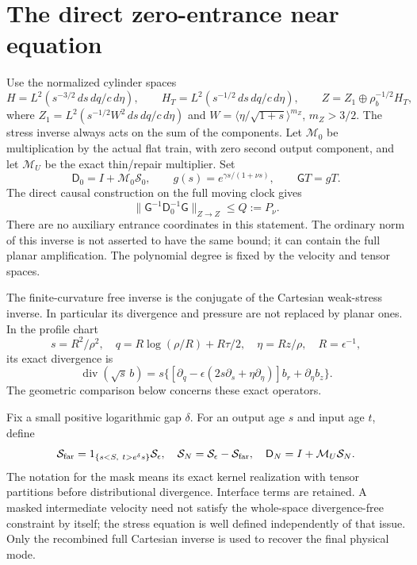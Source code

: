 \section{The direct zero-entrance near equation}

Use the normalized cylinder spaces
\[
 H=L^2(s^{-3/2}\,ds\,dq/c\,d\eta),\qquad
 H_T=L^2(s^{-1/2}\,ds\,dq/c\,d\eta),\qquad
 Z=Z_1\oplus\rho_b^{-1/2}H_T,
\]
where \(Z_1=L^2(s^{-1/2}W^2\,ds\,dq/c\,d\eta)\) and
\(W=\langle\eta/\sqrt{1+s}\rangle^{m_Z}\), \(m_Z>3/2\).
The stress inverse always acts on the sum of the components. Let
\(\mathcal M_0\) be multiplication by the actual flat train, with
zero second output component, and let \(\mathcal M_U\) be the
exact thin/repair multiplier. Set
\[
 \mathsf D_0=I+\mathcal M_0\mathcal S_0,\qquad
 g(s)=e^{\gamma s/(1+\nu s)},\qquad \mathsf G T=gT.
\]
The direct causal construction on the full moving clock gives
\begin{equation}\label{near:flat-bound}
 \|\mathsf G^{-1}\mathsf D_0^{-1}\mathsf G\|_{Z\to Z}
 \le Q:=P_\nu.
\end{equation}
There are no auxiliary entrance coordinates in this statement.
The ordinary norm of this inverse is not asserted to have the same
bound; it can contain the full planar amplification. The polynomial
degree is fixed by the velocity and tensor spaces.

The finite-curvature free inverse is the conjugate of the Cartesian
weak-stress inverse. In particular its divergence and pressure are
not replaced by planar ones. In the profile chart
\[
 s=R^2/\rho^2,\quad q=R\log(\rho/R)+R\tau/2,
 \quad\eta=Rz/\rho,\quad R=\epsilon^{-1},
\]
its exact divergence is
\[
 \operatorname{div}(\sqrt{s}\,b)
 =s\{[\partial_q-\epsilon(2s\partial_s+\eta\partial_\eta)]b_r
                   +\partial_\eta b_z\}.
\]
The geometric comparison below concerns these exact operators.

Fix a small positive logarithmic gap \(\delta\). For an output age
\(s\) and input age \(t\), define
\[
 \mathcal S_{\rm far}
   =1_{\{s<S,\ t>e^\delta s\}}\mathcal S_\epsilon,
 \quad \mathcal S_N=\mathcal S_\epsilon-\mathcal S_{\rm far},
 \quad \mathsf D_N=I+\mathcal M_U\mathcal S_N.
\]
The notation for the mask means its exact kernel realization with
tensor partitions before distributional divergence. Interface terms
are retained. A masked intermediate velocity need not satisfy the
whole-space divergence-free constraint by itself; the stress equation is
well defined independently of that issue. Only the recombined full
Cartesian inverse is used to recover the final physical mode.

